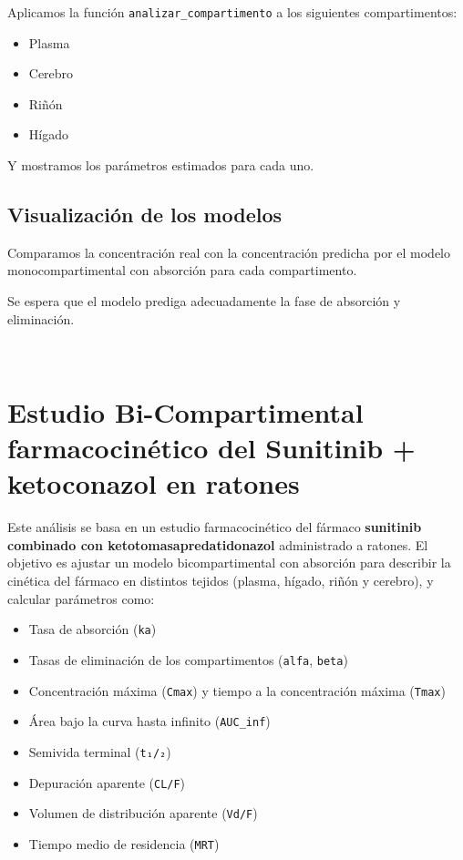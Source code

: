 \documentclass[11pt]{article}
\providecommand{\tightlist}{%
      \setlength{\itemsep}{0pt}\setlength{\parskip}{0pt}}
\begin{document}
Aplicamos la función \texttt{analizar\_compartimento} a los siguientes
compartimentos:

\begin{itemize}
\tightlist
\item
  Plasma
\item
  Cerebro
\item
  Riñón
\item
  Hígado
\end{itemize}

Y mostramos los parámetros estimados para cada uno.

    \subsection{Visualización de los
modelos}\label{visualizaciuxf3n-de-los-modelos}

Comparamos la concentración real con la concentración predicha por el
modelo monocompartimental con absorción para cada compartimento.

Se espera que el modelo prediga adecuadamente la fase de absorción y
eliminación.

    \begin{center}
    \end{center}
    { \hspace*{\fill} \\}
    
    \section{Estudio Bi-Compartimental farmacocinético del Sunitinib +
ketoconazol en ratones
🧪🐭}\label{estudio-bi-compartimental-farmacocinuxe9tico-del-sunitinib-ketoconazol-en-ratones}

Este análisis se basa en un estudio farmacocinético del fármaco
\textbf{sunitinib combinado con ketotomasapredatidonazol} administrado a
ratones. El objetivo es ajustar un modelo bicompartimental con absorción
para describir la cinética del fármaco en distintos tejidos (plasma,
hígado, riñón y cerebro), y calcular parámetros como:

\begin{itemize}
\tightlist
\item
  Tasa de absorción (\texttt{ka})
\item
  Tasas de eliminación de los compartimentos (\texttt{alfa},
  \texttt{beta})
\item
  Concentración máxima (\texttt{Cmax}) y tiempo a la concentración
  máxima (\texttt{Tmax})
\item
  Área bajo la curva hasta infinito (\texttt{AUC\_inf})
\item
  Semivida terminal (\texttt{t₁/₂})
\item
  Depuración aparente (\texttt{CL/F})
\item
  Volumen de distribución aparente (\texttt{Vd/F})
\item
  Tiempo medio de residencia (\texttt{MRT})
\end{itemize}
\end{document}
